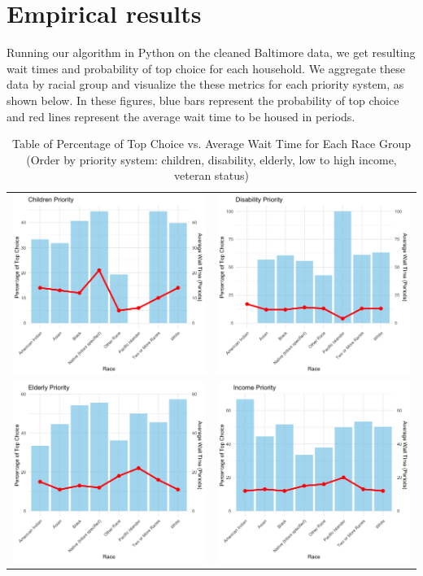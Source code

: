 \documentclass[11pt]{article}
\begin{document}
\newpage
\section{Empirical results}
Running our algorithm in Python on the cleaned Baltimore data, we get resulting wait times and probability of top choice for each household. We aggregate these data by racial group and visualize the these metrics for each priority system, as shown below. In these figures, blue bars represent the probability of top choice and red lines represent the average wait time to be housed in periods.
        \begin{table}[h]
            \centering
                \caption{Table of Percentage of Top Choice vs. Average Wait Time for Each Race Group \\
                (Order by priority system: children, disability, elderly, low to high income, veteran status)}
                \vspace{1.1em}
                \begin{tabular}{cc}
                    \includegraphics[width=0.33\linewidth]{Children.png}
                    & \includegraphics[width=0.33\linewidth]{Disability.png} \\[-4pt]
                    \includegraphics[width=0.33\linewidth]{Elderly.png} & \includegraphics[width=0.33\linewidth]{Income.png} 
                \end{tabular}%
        \end{table}
\end{document}
